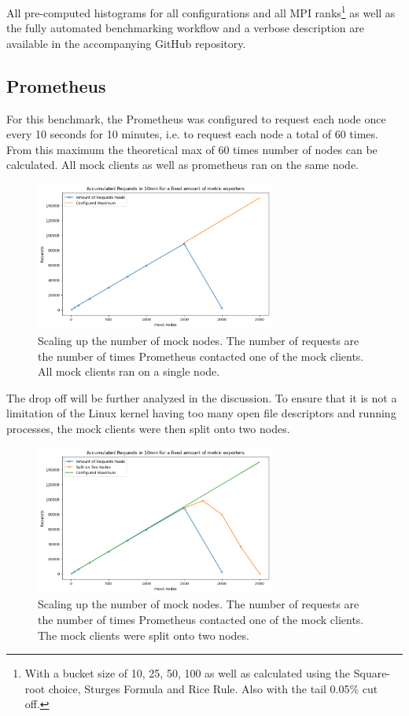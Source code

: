 All pre-computed histograms for all configurations and all MPI ranks\footnote{With a bucket size of 10, 25, 50, 100 as well as calculated using the Square-root choice, Sturges Formula and Rice Rule. Also with the tail 0.05\% cut off.} as well as the fully automated benchmarking workflow and a verbose description are available in the accompanying GitHub repository.

\subsection{Prometheus}
For this benchmark, the Prometheus was configured to request each node once every 10 seconds for 10 minutes, i.e. to request each node a total of 60 times. From this maximum the theoretical max of 60 times number of nodes can be calculated. All mock clients as well as prometheus ran on the same node.

\begin{figure}[H]
  \centering
  \includegraphics[width=0.7\textwidth]{./plots/prometheus_1node.png}
  \caption{Scaling up the number of mock nodes. The number of requests are the number of times Prometheus contacted one of the mock clients. All mock clients ran on a single node.}
\end{figure}

The drop off will be further analyzed in the discussion. To ensure that it is not a limitation of the Linux kernel having too many open file descriptors and running processes, the mock clients were then split onto two nodes.

\begin{figure}[H]
  \centering
  \includegraphics[width=0.7\textwidth]{./plots/prometheus_2node.png}
  \caption{Scaling up the number of mock nodes. The number of requests are the number of times Prometheus contacted one of the mock clients. The mock clients were split onto two nodes.}
\end{figure}

